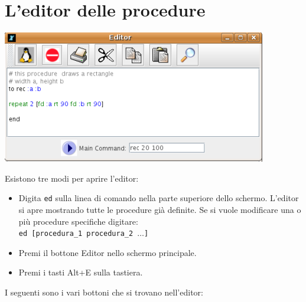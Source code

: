 \section{L'editor delle procedure}
\begin{center}
	\includegraphics[scale=0.4]{pics/interface-CaptureEditor.png}
\end{center}
Esistono tre modi per aprire l'editor:\\
\begin{itemize}
	\item Digita \texttt{ed} sulla linea di comando nella parte superiore dello schermo. L'editor si apre mostrando tutte le procedure già definite. Se si vuole modificare una o più procedure specifiche digitare:\\
	\texttt{ed {[}procedura\_1 procedura\_2 $\ldots$]}
	\item Premi il bottone Editor nello schermo principale. 
	\item Premi i tasti Alt+E sulla tastiera. 
\end{itemize}
I seguenti sono i vari bottoni che si trovano nell'editor:\\

